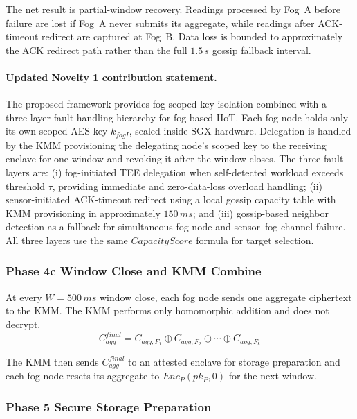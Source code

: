 \documentclass[conference]{IEEEtran}
\begin{document}
    The net result is partial-window recovery. Readings processed by Fog~A before failure are lost if Fog~A never submits its aggregate, while readings after ACK-timeout redirect are captured at Fog~B. Data loss is bounded to approximately the ACK redirect path rather than the full $1.5\,s$ gossip fallback interval.

    \paragraph{Updated Novelty 1 contribution statement.}
    The proposed framework provides fog-scoped key isolation combined with a three-layer fault-handling hierarchy for fog-based IIoT. Each fog node holds only its own scoped AES key $k_{fogI}$, sealed inside SGX hardware. Delegation is handled by the KMM provisioning the delegating node's scoped key to the receiving enclave for one window and revoking it after the window closes. The three fault layers are: (i) fog-initiated TEE delegation when self-detected workload exceeds threshold $\tau$, providing immediate and zero-data-loss overload handling; (ii) sensor-initiated ACK-timeout redirect using a local gossip capacity table with KMM provisioning in approximately $150\,ms$; and (iii) gossip-based neighbor detection as a fallback for simultaneous fog-node and sensor--fog channel failure. All three layers use the same $CapacityScore$ formula for target selection.

    \subsubsection{\textbf{Phase 4c Window Close and KMM Combine}}

    At every $W=500\,ms$ window close, each fog node sends one aggregate ciphertext to the KMM. The KMM performs only homomorphic addition and does not decrypt.
    \begin{equation}
    C_{agg}^{final} = C_{agg,F_1} \oplus C_{agg,F_2} \oplus \cdots \oplus C_{agg,F_k}
    \end{equation}

    The KMM then sends $C_{agg}^{final}$ to an attested enclave for storage preparation and each fog node resets its aggregate to $Enc_P(pk_P,0)$ for the next window.

    \subsubsection{\textbf{Phase 5 Secure Storage Preparation}}
\end{document}
